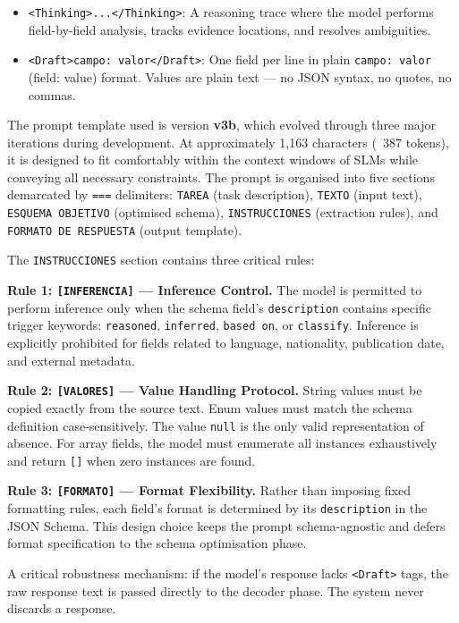 \documentclass[onecolumn]{ceurart}
\begin{document}
\begin{itemize}
  \item \texttt{<Thinking>...</Thinking>}: A reasoning trace where the model
  performs field-by-field analysis, tracks evidence locations, and resolves
  ambiguities.
  \item \texttt{<Draft>campo: valor</Draft>}: One field per line in plain
  \texttt{campo: valor} (field: value) format. Values are plain text --- no
  JSON syntax, no quotes, no commas.
\end{itemize}

The prompt template used is version \textbf{v3b}, which evolved through three
major iterations during development. At approximately 1,163 characters (~387
tokens), it is designed to fit comfortably within the context windows of SLMs
while conveying all necessary constraints. The prompt is organised into five
sections demarcated by \texttt{===} delimiters: \texttt{TAREA} (task
description), \texttt{TEXTO} (input text), \texttt{ESQUEMA OBJETIVO} (optimised
schema), \texttt{INSTRUCCIONES} (extraction rules), and \texttt{FORMATO DE
RESPUESTA} (output template).

The \texttt{INSTRUCCIONES} section contains three critical rules:

\textbf{Rule 1: \texttt{[INFERENCIA]} --- Inference Control.} The model is
permitted to perform inference only when the schema field's \texttt{description}
contains specific trigger keywords: \texttt{reasoned}, \texttt{inferred},
\texttt{based on}, or \texttt{classify}. Inference is explicitly prohibited for
fields related to language, nationality, publication date, and external
metadata.

\textbf{Rule 2: \texttt{[VALORES]} --- Value Handling Protocol.} String values
must be copied exactly from the source text. Enum values must match the schema
definition case-sensitively. The value \texttt{null} is the only valid
representation of absence. For array fields, the model must enumerate all
instances exhaustively and return \texttt{[]} when zero instances are found.

\textbf{Rule 3: \texttt{[FORMATO]} --- Format Flexibility.} Rather than
imposing fixed formatting rules, each field's format is determined by its
\texttt{description} in the JSON Schema. This design choice keeps the prompt
schema-agnostic and defers format specification to the schema optimisation
phase.

A critical robustness mechanism: if the model's response lacks \texttt{<Draft>}
tags, the raw response text is passed directly to the decoder phase. The system
never discards a response.
\end{document}
